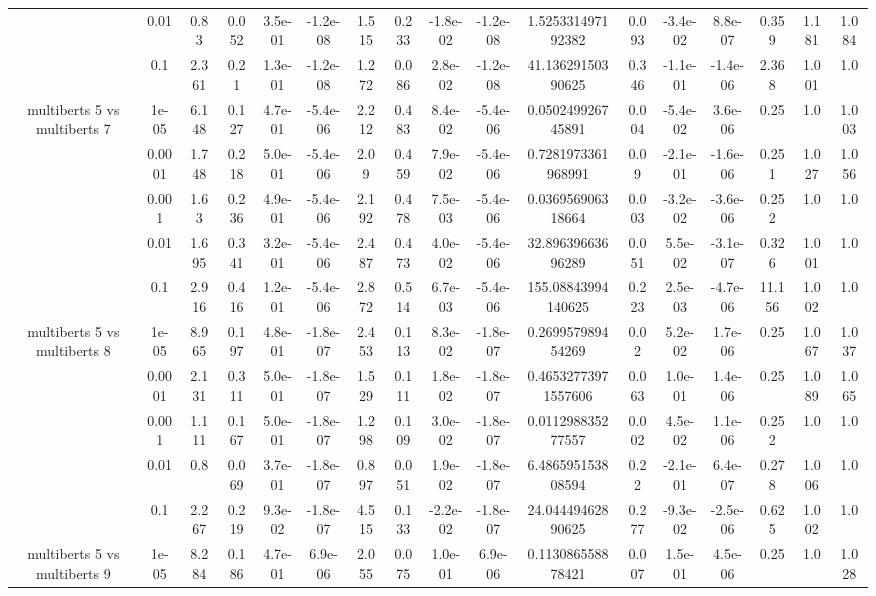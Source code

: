 \begin{tabular}{|c|c|c|c|c|c|c|c|c|c|c|c|c|c|c|c|c|}
 & 0.01 & 0.83 & 0.052 & 3.5e-01 & -1.2e-08 & 1.515 & 0.233 & -1.8e-02 & -1.2e-08 & 1.525331497192382 & 0.093 & -3.4e-02 & 8.8e-07 & 0.359 & 1.181 & 1.084 \\
 & 0.1 & 2.361 & 0.21 & 1.3e-01 & -1.2e-08 & 1.272 & 0.086 & 2.8e-02 & -1.2e-08 & 41.13629150390625 & 0.346 & -1.1e-01 & -1.4e-06 & 2.368 & 1.001 & 1.0 \\
\hline
\multirow{5}{*}{multiberts 5 vs multiberts 7} & 1e-05 & 6.148 & 0.127 & 4.7e-01 & -5.4e-06 & 2.212 & 0.483 & 8.4e-02 & -5.4e-06 & 0.050249926745891 & 0.004 & -5.4e-02 & 3.6e-06 & 0.25 & 1.0 & 1.003 \\
 & 0.0001 & 1.748 & 0.218 & 5.0e-01 & -5.4e-06 & 2.09 & 0.459 & 7.9e-02 & -5.4e-06 & 0.7281973361968991 & 0.09 & -2.1e-01 & -1.6e-06 & 0.251 & 1.027 & 1.056 \\
 & 0.001 & 1.63 & 0.236 & 4.9e-01 & -5.4e-06 & 2.192 & 0.478 & 7.5e-03 & -5.4e-06 & 0.036956906318664 & 0.003 & -3.2e-02 & -3.6e-06 & 0.252 & 1.0 & 1.0 \\
 & 0.01 & 1.695 & 0.341 & 3.2e-01 & -5.4e-06 & 2.487 & 0.473 & 4.0e-02 & -5.4e-06 & 32.89639663696289 & 0.051 & 5.5e-02 & -3.1e-07 & 0.326 & 1.001 & 1.0 \\
 & 0.1 & 2.916 & 0.416 & 1.2e-01 & -5.4e-06 & 2.872 & 0.514 & 6.7e-03 & -5.4e-06 & 155.08843994140625 & 0.223 & 2.5e-03 & -4.7e-06 & 11.156 & 1.002 & 1.0 \\
\hline
\multirow{5}{*}{multiberts 5 vs multiberts 8} & 1e-05 & 8.965 & 0.197 & 4.8e-01 & -1.8e-07 & 2.453 & 0.113 & 8.3e-02 & -1.8e-07 & 0.269957989454269 & 0.02 & 5.2e-02 & 1.7e-06 & 0.25 & 1.067 & 1.037 \\
 & 0.0001 & 2.131 & 0.311 & 5.0e-01 & -1.8e-07 & 1.529 & 0.111 & 1.8e-02 & -1.8e-07 & 0.46532773971557606 & 0.063 & 1.0e-01 & 1.4e-06 & 0.25 & 1.089 & 1.065 \\
 & 0.001 & 1.111 & 0.167 & 5.0e-01 & -1.8e-07 & 1.298 & 0.109 & 3.0e-02 & -1.8e-07 & 0.011298835277557 & 0.002 & 4.5e-02 & 1.1e-06 & 0.252 & 1.0 & 1.0 \\
 & 0.01 & 0.8 & 0.069 & 3.7e-01 & -1.8e-07 & 0.897 & 0.051 & 1.9e-02 & -1.8e-07 & 6.486595153808594 & 0.22 & -2.1e-01 & 6.4e-07 & 0.278 & 1.006 & 1.0 \\
 & 0.1 & 2.267 & 0.219 & 9.3e-02 & -1.8e-07 & 4.515 & 0.133 & -2.2e-02 & -1.8e-07 & 24.04449462890625 & 0.277 & -9.3e-02 & -2.5e-06 & 0.625 & 1.002 & 1.0 \\
\hline
\multirow{5}{*}{multiberts 5 vs multiberts 9} & 1e-05 & 8.284 & 0.186 & 4.7e-01 & 6.9e-06 & 2.055 & 0.075 & 1.0e-01 & 6.9e-06 & 0.113086558878421 & 0.007 & 1.5e-01 & 4.5e-06 & 0.25 & 1.0 & 1.028 \\

\end{tabular}
